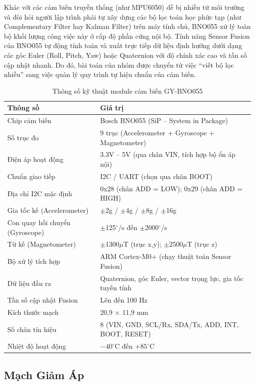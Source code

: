 Khác với các cảm biến truyền thống (như MPU6050) dễ bị nhiễu từ môi trường và đòi hỏi người lập trình phải tự xây dựng các bộ lọc toán học phức tạp (như Complementary Filter hay Kalman Filter) trên máy tính chủ, BNO055 xử lý toàn bộ khối lượng công việc này ở cấp độ phần cứng nội bộ. Tính năng Sensor Fusion của BNO055 tự động tính toán và xuất trực tiếp dữ liệu định hướng dưới dạng các góc Euler (Roll, Pitch, Yaw) hoặc Quaternion với độ chính xác cao và tần số cập nhật nhanh. Do đó, bài toán của nhóm được chuyển từ việc ``viết bộ lọc nhiễu'' sang việc quản lý quy trình tự hiệu chuẩn của cảm biến.
\begin{table}[H]
\centering
\caption{Thông số kỹ thuật module cảm biến GY-BNO055}
\label{tab:bno055_specs}
\renewcommand{\arraystretch}{1.3}
\begin{tabular}{ll}
\toprule
\textbf{Thông số} & \textbf{Giá trị} \\
\midrule
Chip cảm biến & Bosch BNO055 (SiP -- System in Package) \\
Số trục đo & 9 trục (Accelerometer + Gyroscope + Magnetometer) \\
Điện áp hoạt động & 3.3V -- 5V (qua chân VIN, tích hợp bộ ổn áp nội) \\
Chuẩn giao tiếp & I2C / UART (chọn qua chân BOOT) \\
Địa chỉ I2C mặc định & 0x28 (chân ADD = LOW); 0x29 (chân ADD = HIGH) \\
Gia tốc kế (Accelerometer) & $\pm$2g / $\pm$4g / $\pm$8g / $\pm$16g \\
Con quay hồi chuyển (Gyroscope) & $\pm$125$^\circ$/s đến $\pm$2000$^\circ$/s \\
Từ kế (Magnetometer) & $\pm$1300$\mu$T (trục x,y); $\pm$2500$\mu$T (trục z) \\
Bộ xử lý tích hợp & ARM Cortex-M0+ (chạy thuật toán Sensor Fusion) \\
Dữ liệu đầu ra & Quaternion, góc Euler, vector trọng lực, gia tốc tuyến tính \\
Tần số cập nhật Fusion & Lên đến 100 Hz \\
Kích thước mạch & 20,9 $\times$ 11,9 mm \\
Số chân tín hiệu & 8 (VIN, GND, SCL/Rx, SDA/Tx, ADD, INT, BOOT, RESET) \\
Nhiệt độ hoạt động & $-40^\circ$C đến $+85^\circ$C \\
\bottomrule
\end{tabular}
\end{table}
\subsection{Mạch Giảm Áp }

